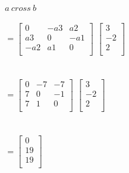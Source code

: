 \documentclass[11pt]{article}
\begin{document}
$a ~cross~ b$
\\
\\
$
= \begin{bmatrix}
   0 & -a3 & a2\\
   a3 & 0 & -a1\\
   -a2 & a1 & 0\\
\end{bmatrix}
$
$
\begin{bmatrix}
 3\\
 -2\\
 2\\
\end{bmatrix}
$
\\
\\
\\
$
= \begin{bmatrix}
  0 & -7 & -7\\
  7 & 0 & -1\\
  7 & 1 & 0\\
\end{bmatrix}
$
$
\begin{bmatrix}
 3\\
 -2\\
 2\\
\end{bmatrix}
$
\\
\\
\\
$
=\begin{bmatrix}
 0\\
 19\\
 19\\
\end{bmatrix}
$
\end{document}
